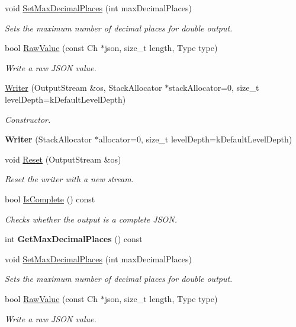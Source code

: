 \begin{DoxyCompactItemize}
\item 
void \hyperlink{class_writer_a58e3f94dc5af1432a8eace5ba427eca7}{Set\+Max\+Decimal\+Places} (int max\+Decimal\+Places)
\begin{DoxyCompactList}\small\item\em Sets the maximum number of decimal places for double output. \end{DoxyCompactList}\item 
bool \hyperlink{class_writer_ae0d1615104e4e88040b9640e6784008a}{Raw\+Value} (const Ch $\ast$json, size\+\_\+t length, Type type)
\begin{DoxyCompactList}\small\item\em Write a raw J\+S\+ON value. \end{DoxyCompactList}\item 
\hyperlink{class_writer_af4f54830d6927d9daf5bd53bfd134dd3}{Writer} (Output\+Stream \&os, Stack\+Allocator $\ast$stack\+Allocator=0, size\+\_\+t level\+Depth=k\+Default\+Level\+Depth)
\begin{DoxyCompactList}\small\item\em Constructor. \end{DoxyCompactList}\item 
{\bfseries Writer} (Stack\+Allocator $\ast$allocator=0, size\+\_\+t level\+Depth=k\+Default\+Level\+Depth)\hypertarget{class_writer_a7b885cea71542fc436be80eff447fb64}{}\label{class_writer_a7b885cea71542fc436be80eff447fb64}

\item 
void \hyperlink{class_writer_a8b53e8f137f7fcf694f5500711b3f58d}{Reset} (Output\+Stream \&os)
\begin{DoxyCompactList}\small\item\em Reset the writer with a new stream. \end{DoxyCompactList}\item 
bool \hyperlink{class_writer_a446cfad4b88cfd69b1b63d57989f2e76}{Is\+Complete} () const 
\begin{DoxyCompactList}\small\item\em Checks whether the output is a complete J\+S\+ON. \end{DoxyCompactList}\item 
int {\bfseries Get\+Max\+Decimal\+Places} () const \hypertarget{class_writer_abbd76fd072c7feca94ddb0a02fb6e44b}{}\label{class_writer_abbd76fd072c7feca94ddb0a02fb6e44b}

\item 
void \hyperlink{class_writer_a58e3f94dc5af1432a8eace5ba427eca7}{Set\+Max\+Decimal\+Places} (int max\+Decimal\+Places)
\begin{DoxyCompactList}\small\item\em Sets the maximum number of decimal places for double output. \end{DoxyCompactList}\item 
bool \hyperlink{class_writer_ae0d1615104e4e88040b9640e6784008a}{Raw\+Value} (const Ch $\ast$json, size\+\_\+t length, Type type)
\begin{DoxyCompactList}\small\item\em Write a raw J\+S\+ON value. \end{DoxyCompactList}\end{DoxyCompactItemize}
